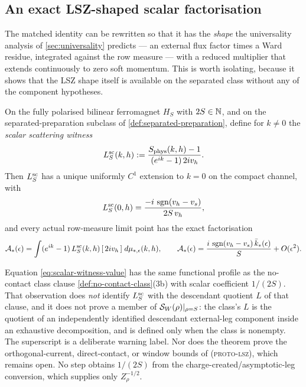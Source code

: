 \subsection{An exact LSZ-shaped scalar factorisation}

The matched identity can be rewritten so that it has the \emph{shape} the
universality analysis of \cref{sec:universality} predicts --- an external flux
factor times a Ward residue, integrated against the row measure --- with a
reduced multiplier that extends continuously to zero soft momentum. This is
worth isolating, because it shows that the LSZ shape itself is available on
the separated class without any of the component hypotheses.

\begin{theorem}
\label{thm:proto-scalar}
\statusProved

On the fully polarised bilinear ferromagnet $H_S$ with $2S\in\mathbb{N}$, and on the
separated-preparation subclass of \cref{def:separated-preparation}, define for
$k\neq0$ the \emph{scalar scattering witness}
\begin{equation}
  L_S^{\rm sc}(k,h):=\frac{S_{\rm phys}(k,h)-1}{(e^{ik}-1)\,2iv_h}.
  \label{eq:scalar-witness}
\end{equation}
Then $L_S^{\rm sc}$ has a unique uniformly $C^1$ extension to $k=0$ on the
compact channel, with
\begin{equation}
  L_S^{\rm sc}(0,h)=\frac{-i\,\operatorname{sgn}(v_h-v_s)}{2S\,v_h},
  \label{eq:scalar-witness-value}
\end{equation}
and every actual row-measure limit point has the exact factorisation
\begin{equation}
  \mathcal{A}_*(\epsilon)=
  \int(e^{ik}-1)\,L_S^{\rm sc}(k,h)\,[\,2iv_h\,]\;d\mu_{*,\epsilon}(k,h),
  \qquad
  \mathcal{A}_*(\epsilon)=\frac{i\,\operatorname{sgn}(v_h-v_s)\,\bar k_*(\epsilon)}{S}
  +O(\epsilon^2).
  \label{eq:scalar-factorisation}
\end{equation}
\end{theorem}

\begin{scope}
\label{scope:proto-scalar}
Equation \cref{eq:scalar-witness-value} has the same functional profile as the
no-contact class clause \cref{def:no-contact-class}(3b) with scalar
coefficient $1/(2S)$. That observation does \emph{not} identify
$L_S^{\rm sc}$ with the descendant quotient $L$ of that clause, and it does
not prove a member of $\mathcal{S}_W(\rho)|_{\rho=S}$: the class's $L$ is the
quotient of an independently identified descendant external-leg component
inside an exhaustive decomposition, and is defined only when the class is
nonempty. The superscript is a deliberate warning label. Nor does the theorem
prove the orthogonal-current, direct-contact, or window bounds of
\textsc{(proto-lsz)}, which remains open. No step obtains $1/(2S)$ from the
charge-created/asymptotic-leg conversion, which supplies only
$Z_\rho^{-1/2}$.
\end{scope}

